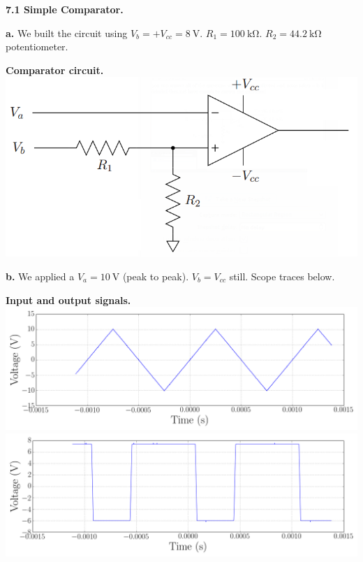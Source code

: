 \documentclass{article}
\newenvironment{2colfig}{
  \par\medskip\noindent\minipage{\linewidth}
} {
  \endminipage\par\medskip
}
\newcommand{\labhead}[1]{
  \vspace{1em}
  {\bf #1}$_{\,}$
  \hline
  \vspace{1em}
}
\begin{document}
\rhead{\thepage} 
\pagestyle{fancy} 
\fancyfoot[c]{} 
\setlength{\parindent}{0pt}

\begin{multicols*}{2}
\labhead{7.1 Simple Comparator.}  
{\bf a.} We built the circuit using $V_b = +V_{cc} = \SI{8}{\volt}$. $R_1 = \SI{100}{\kilo\ohm}$. $R_2 = \SI{44.2}{\kilo\ohm}$ potentiometer.
\newline

\begin{2colfig}
  \center
  {\bf Comparator circuit.} \newline
  \includegraphics[scale=.4]{circuit1}
  \label{fig:circ1}
\end{2colfig}

{\bf b.} We applied a $V_a = \SI{10}{\volt}$ (peak to peak). $V_b = V_{cc}$ still. Scope traces below.

\begin{2colfig}
  \center
  {\bf Input and output signals.} \newline
  \includegraphics[scale=.22]{day1_lab8/ALL0000/F0000CH1}
  \includegraphics[scale=.22]{day1_lab8/ALL0000/F0000CH2}
  \label{fig:plot1}
\end{2colfig}


\end{multicols*}
\end{document}
